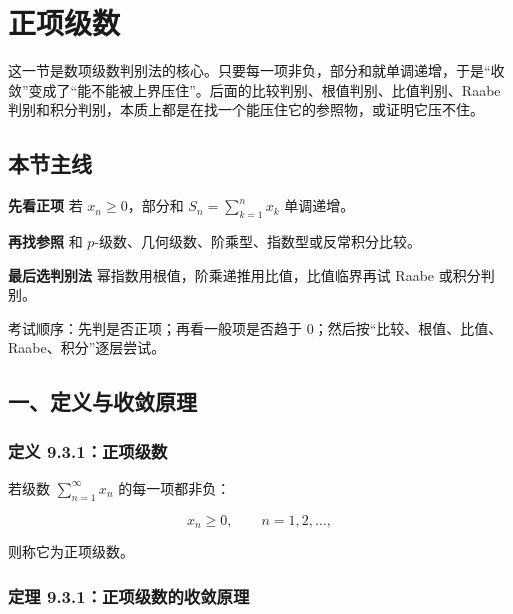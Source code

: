 \section{正项级数}

这一节是数项级数判别法的核心。只要每一项非负，部分和就单调递增，于是“收敛”变成了“能不能被上界压住”。后面的比较判别、根值判别、比值判别、Raabe 判别和积分判别，本质上都是在找一个能压住它的参照物，或证明它压不住。

\subsection*{本节主线}

\begin{conceptbox}
\textbf{先看正项}
若 \(x_n\ge 0\)，部分和 \(S_n=\sum_{k=1}^n x_k\) 单调递增。
\end{conceptbox}

\begin{conceptbox}
\textbf{再找参照}
和 \(p\)-级数、几何级数、阶乘型、指数型或反常积分比较。
\end{conceptbox}

\begin{conceptbox}
\textbf{最后选判别法}
幂指数用根值，阶乘递推用比值，比值临界再试 Raabe 或积分判别。
\end{conceptbox}

\begin{notebox}
考试顺序：先判是否正项；再看一般项是否趋于 \(0\)；然后按“比较、根值、比值、Raabe、积分”逐层尝试。
\end{notebox}

\subsection*{一、定义与收敛原理}

\subsubsection*{定义 9.3.1：正项级数}

若级数 \(\sum_{n=1}^{\infty}x_n\) 的每一项都非负：

\[
      x_n\ge 0,\qquad n=1,2,\ldots,
    \]

则称它为正项级数。

\subsubsection*{定理 9.3.1：正项级数的收敛原理}

